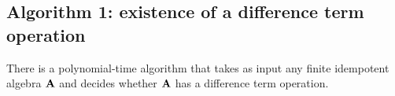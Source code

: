 
\subsection{Algorithm 1: existence of a difference term operation}
\label{sec:algor-1}
\begin{cor}
  \label{cor:algor-1}
  There is a polynomial-time algorithm that takes as input
  any finite idempotent algebra $\mathbf{A}$ and decides whether
  $\mathbf{A}$ has a difference term operation.
\end{cor}
